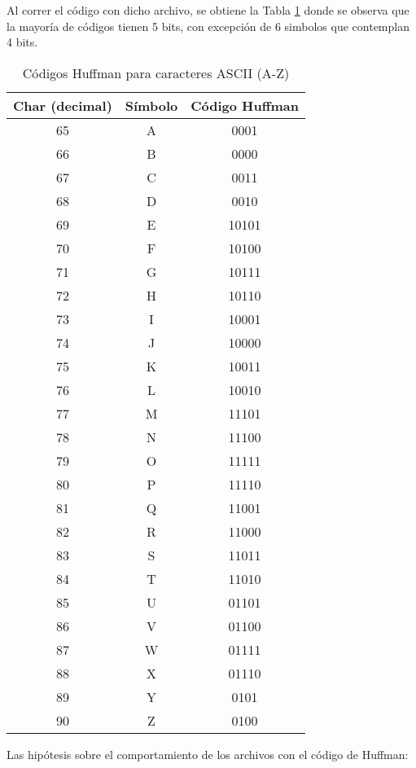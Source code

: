 \documentclass[conference,onecolumn,12pt]{IEEEtran}
\numberwithin{equation}{subsection}
\begin{document}
Al correr el código con dicho archivo, se obtiene la Tabla \ref{tab:huffman_abc} donde se observa que la mayoría de códigos tienen 5 bits, con excepción de 6 simbolos que contemplan 4 bits.

\begin{table}[h!]
    \centering
    \caption{Códigos Huffman para caracteres ASCII (A-Z)}
    \label{tab:huffman_abc}
    \begin{tabular}{ccc}
    \toprule
    \textbf{Char (decimal)} & \textbf{Símbolo} & \textbf{Código Huffman} \\
    \midrule
    65 & A & 0001 \\
    66 & B & 0000 \\
    67 & C & 0011 \\
    68 & D & 0010 \\
    69 & E & 10101 \\
    70 & F & 10100 \\
    71 & G & 10111 \\
    72 & H & 10110 \\
    73 & I & 10001 \\
    74 & J & 10000 \\
    75 & K & 10011 \\
    76 & L & 10010 \\
    77 & M & 11101 \\
    78 & N & 11100 \\
    79 & O & 11111 \\
    80 & P & 11110 \\
    81 & Q & 11001 \\
    82 & R & 11000 \\
    83 & S & 11011 \\
    84 & T & 11010 \\
    85 & U & 01101 \\
    86 & V & 01100 \\
    87 & W & 01111 \\
    88 & X & 01110 \\
    89 & Y & 0101 \\
    90 & Z & 0100 \\
    \bottomrule
    \end{tabular}
\end{table}

Las hipótesis sobre el comportamiento de los archivos con el código de Huffman:
\end{document}
